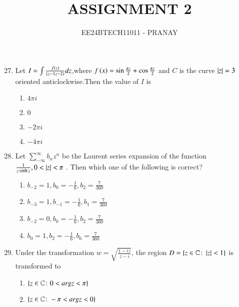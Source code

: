 \documentclass[journal,12pt,onecolumn]{IEEEtran}
\theoremstyle{remark}
\begin{document}

\vspace{3cm}

\title{ASSIGNMENT 2}
\author{EE24BTECH11011 - PRANAY}
\maketitle

\bigskip

\renewcommand{\thefigure}{\theenumi}
\renewcommand{\thetable}{\theenumi}
\begin{enumerate}\setcounter{enumi}{26}
	\item Let $I = \int {\frac{f\ensuremath{\left(z\right)}}{\ensuremath{\left({z-1}{z-2}\right)}}}dz$,where $f\left(x\right) = \sin{\frac{\pi z}{2}} + \cos{\frac{\pi z}{2}}$ and $C$ is the curve $\left\vert z\right\vert = 3$
oriented anticlockwise.Then the value of $I$ is 
\begin{enumerate}
\item $4\pi i$
\item $0$
\item $-2\pi i$
\item $-4 \pi i$\\
\end{enumerate}
\item  Let $\sum_{-\infty}^{\infty}b_n z^n$ be the Laurent series expansion of the function $\frac{1}{z\sinh{z}} , 0<\left\vert z\right\vert<\pi$ . Then which one of the following is correct?
\begin{multicols}{2}
\begin{enumerate}
    \item $b_{-2} = 1 ,b_0 = -\frac{1}{6} , b_2 = \frac{7}{360}$\\
    \item $b_{-3} = 1 ,b_{-1} = -\frac{1}{6} , b_1 = \frac{7}{360}$
    \item $b_{-2} = 0 ,b_0 = -\frac{1}{6} , b_2 = \frac{7}{360}$\\
    \item $b_{0} = 1 ,b_2 = -\frac{1}{6} , b_6 = \frac{7}{360}$
\end{enumerate}
\end{multicols}
\item Under the transformation $w = \sqrt{\frac{1-iz}{z-i}}$, the region $D = \left\{z \in \mathbb{C}\colon \left\vert z\right\vert<1\right\}$ is transformed to
\begin{enumerate}
    \item $\left\{z \in \mathbb{C}\colon 0<arg z<\pi\right\}$
    \item $\left\{z \in \mathbb{C}\colon -\pi<arg z<0\right\}$

\end{enumerate}
\end{enumerate}
\end{document}
